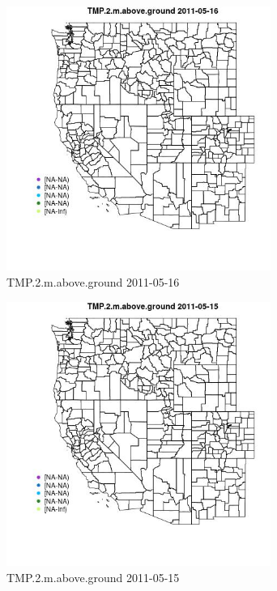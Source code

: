 \clearpage 

\begin{figure} 
\centering  
\includegraphics[width=0.77\textwidth]{Code_Outputs/ML_input_report_ML_input_PM25_Step5_part_d_de_duplicated_aves_ML_input_MapObsTMP2maboveground2011-05-16.jpg} 
\caption{\label{fig:ML_input_report_ML_input_PM25_Step5_part_d_de_duplicated_aves_ML_inputMapObsTMP2maboveground2011-05-16}TMP.2.m.above.ground 2011-05-16} 
\end{figure} 
 

\begin{figure} 
\centering  
\includegraphics[width=0.77\textwidth]{Code_Outputs/ML_input_report_ML_input_PM25_Step5_part_d_de_duplicated_aves_ML_input_MapObsTMP2maboveground2011-05-15.jpg} 
\caption{\label{fig:ML_input_report_ML_input_PM25_Step5_part_d_de_duplicated_aves_ML_inputMapObsTMP2maboveground2011-05-15}TMP.2.m.above.ground 2011-05-15} 
\end{figure} 
 

